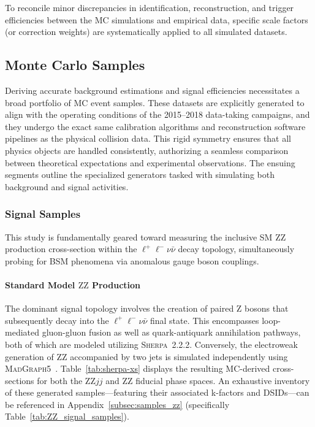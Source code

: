To reconcile minor discrepancies in identification, reconstruction, and trigger efficiencies between the MC simulations and empirical data, specific scale factors (or correction weights) are systematically applied to all simulated datasets.


\subsection{Monte Carlo Samples}

Deriving accurate background estimations and signal efficiencies necessitates a broad portfolio of MC event samples. These datasets are explicitly generated to align with the operating conditions of the 2015--2018 data-taking campaigns, and they undergo the exact same calibration algorithms and reconstruction software pipelines as the physical collision data. This rigid symmetry ensures that all physics objects are handled consistently, authorizing a seamless comparison between theoretical expectations and experimental observations. The ensuing segments outline the specialized generators tasked with simulating both background and signal activities. 


\subsubsection{Signal Samples}
This study is fundamentally geared toward measuring the inclusive SM $\text{ZZ}$ production cross-section within the $\ell^+\ell^-\nu\bar{\nu}$ decay topology, simultaneously probing for BSM phenomena via anomalous gauge boson couplings.

\paragraph{Standard Model $\text{ZZ}$ Production}
The dominant signal topology involves the creation of paired $\text{Z}$ bosons that subsequently decay into the $\ell^+\ell^-\nu\bar{\nu}$ final state. This encompasses loop-mediated gluon-gluon fusion as well as quark-antiquark annihilation pathways, both of which are modeled utilizing \textsc{Sherpa}~2.2.2. Conversely, the electroweak generation of $\text{ZZ}$ accompanied by two jets is simulated independently using \textsc{MadGraph5}~\cite{Alwall:2014hca}. 
Table~\ref{tab:sherpa-xs} displays the resulting MC-derived cross-sections for both the $\text{ZZ}jj$ and $\text{ZZ}$ fiducial phase spaces. An exhaustive inventory of these generated samples—featuring their associated k-factors and DSIDs—can be referenced in Appendix~\ref{subsec:samples_zz} (specifically Table~\ref{tab:ZZ_signal_samples}).

